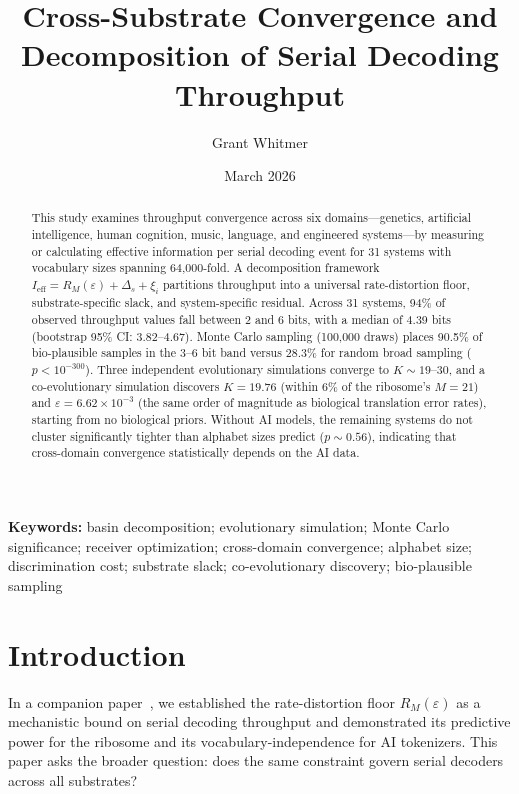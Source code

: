 \documentclass[11pt]{article}
\title{Cross-Substrate Convergence and Decomposition of Serial Decoding Throughput}
\author{Grant Whitmer}
\date{March 2026}
\begin{document}
\maketitle

\begin{abstract}
This study examines throughput convergence across six domains---genetics, artificial intelligence, human cognition, music, language, and engineered systems---by measuring or calculating effective information per serial decoding event for 31 systems with vocabulary sizes spanning 64,000-fold. A decomposition framework $I_{\mathrm{eff}} = R_M(\varepsilon) + \Delta_s + \xi_i$ partitions throughput into a universal rate-distortion floor, substrate-specific slack, and system-specific residual. Across 31 systems, 94\% of observed throughput values fall between 2 and 6 bits, with a median of 4.39 bits (bootstrap 95\% CI: 3.82--4.67). Monte Carlo sampling (100,000 draws) places 90.5\% of bio-plausible samples in the 3--6 bit band versus 28.3\% for random broad sampling ($p < 10^{-300}$). Three independent evolutionary simulations converge to $K \sim 19$--30, and a co-evolutionary simulation discovers $K = 19.76$ (within 6\% of the ribosome's $M = 21$) and $\varepsilon = 6.62 \times 10^{-3}$ (the same order of magnitude as biological translation error rates), starting from no biological priors. Without AI models, the remaining systems do not cluster significantly tighter than alphabet sizes predict ($p \sim 0.56$), indicating that cross-domain convergence statistically depends on the AI data.
\end{abstract}

\noindent\textbf{Keywords:} basin decomposition; evolutionary simulation; Monte Carlo significance; receiver optimization; cross-domain convergence; alphabet size; discrimination cost; substrate slack; co-evolutionary discovery; bio-plausible sampling

\section{Introduction}

In a companion paper~\cite{whitmer2026rlf}, we established the rate-distortion floor $R_M(\varepsilon)$ as a mechanistic bound on serial decoding throughput and demonstrated its predictive power for the ribosome and its vocabulary-independence for AI tokenizers. This paper asks the broader question: does the same constraint govern serial decoders across all substrates?
\end{document}
